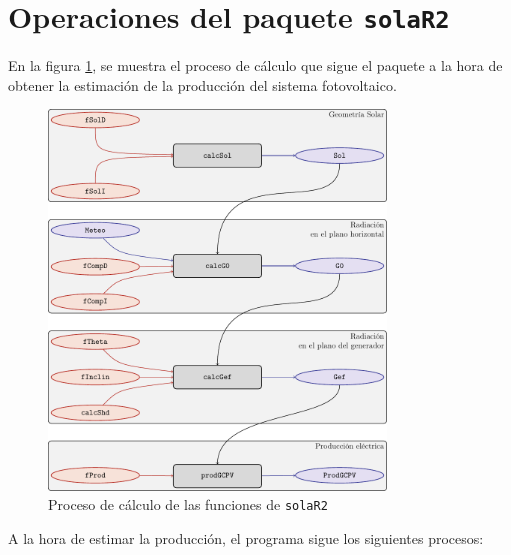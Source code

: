 \section{Operaciones del paquete \texttt{solaR2}}
\label{sec:org51b4c76}
\label{sec:operaciones-paquete}
En la figura \ref{fig:org9226b1d}, se muestra el proceso de cálculo que sigue el paquete a la hora de obtener la estimación de la producción del sistema fotovoltaico.
\begin{figure}[]
\centering
\includegraphics[keepaspectratio,width=0.8\textwidth,height=0.5\textheight]{figuras/procedure.pdf}
\caption{\label{fig:org9226b1d}Proceso de cálculo de las funciones de \texttt{solaR2}}
\end{figure}
A la hora de estimar la producción, el programa sigue los siguientes procesos:
